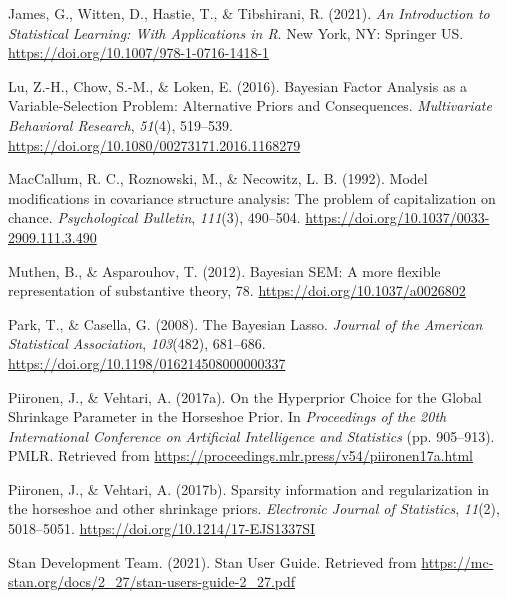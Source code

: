 \documentclass[
  man,floatsintext]{apa6}
\newlength{\cslhangindent}
\newlength{\cslentryspacingunit} %
\newenvironment{CSLReferences}[2] %
 {%
  \setlength{\parindent}{0pt}
  \ifodd #1
  \let\oldpar\par
  \def\par{\hangindent=\cslhangindent\oldpar}
  \fi
  \setlength{\parskip}{#2\cslentryspacingunit}
 }%
 {}
\begin{document}
\begin{CSLReferences}{1}{0}
\leavevmode{}%
James, G., Witten, D., Hastie, T., \& Tibshirani, R. (2021). \emph{An {Introduction} to {Statistical} {Learning}: With {Applications} in {R}}. New York, NY: Springer US. \url{https://doi.org/10.1007/978-1-0716-1418-1}

\leavevmode{}%
Lu, Z.-H., Chow, S.-M., \& Loken, E. (2016). Bayesian {Factor} {Analysis} as a {Variable}-{Selection} {Problem}: {Alternative} {Priors} and {Consequences}. \emph{Multivariate Behavioral Research}, \emph{51}(4), 519--539. \url{https://doi.org/10.1080/00273171.2016.1168279}

\leavevmode{}%
MacCallum, R. C., Roznowski, M., \& Necowitz, L. B. (1992). Model modifications in covariance structure analysis: The problem of capitalization on chance. \emph{Psychological Bulletin}, \emph{111}(3), 490--504. \url{https://doi.org/10.1037/0033-2909.111.3.490}

\leavevmode{}%
Muthen, B., \& Asparouhov, T. (2012). Bayesian {SEM}: {A} more ﬂexible representation of substantive theory, 78. \url{https://doi.org/10.1037/a0026802}

\leavevmode{}%
Park, T., \& Casella, G. (2008). The {Bayesian} {Lasso}. \emph{Journal of the American Statistical Association}, \emph{103}(482), 681--686. \url{https://doi.org/10.1198/016214508000000337}

\leavevmode{}%
Piironen, J., \& Vehtari, A. (2017a). On the {Hyperprior} {Choice} for the {Global} {Shrinkage} {Parameter} in the {Horseshoe} {Prior}. In \emph{Proceedings of the 20th {International} {Conference} on {Artificial} {Intelligence} and {Statistics}} (pp. 905--913). PMLR. Retrieved from \url{https://proceedings.mlr.press/v54/piironen17a.html}

\leavevmode{}%
Piironen, J., \& Vehtari, A. (2017b). Sparsity information and regularization in the horseshoe and other shrinkage priors. \emph{Electronic Journal of Statistics}, \emph{11}(2), 5018--5051. \url{https://doi.org/10.1214/17-EJS1337SI}

\leavevmode{}%
Stan Development Team. (2021). Stan {User} {Guide}. Retrieved from \url{https://mc-stan.org/docs/2_27/stan-users-guide-2_27.pdf}


\end{CSLReferences}
\end{document}
